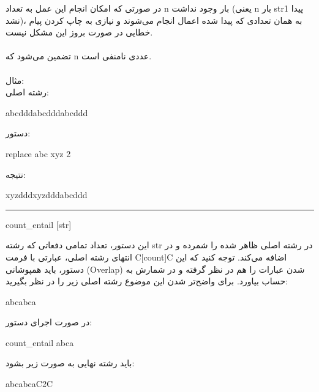 \documentclass[]{article}
\begin{document}
در صورتی که امکان انجام این عمل به تعداد n بار وجود نداشت (یعنی n بار str1 پیدا نشد)، به همان تعدادی که پیدا شده اعمال انجام می‌شوند و نیازی به چاپ کردن پیام خطایی در صورت بروز این مشکل نیست.\\\\
تضمین می‌شود که n عددی نامنفی است.\\\\
مثال:\\
رشته اصلی:\\
\begin{tcolorbox}[boxrule=0pt]
	\begin{latin}
  	  \large{
		abcdddabcdddabcddd
		}
	\end{latin}
\end{tcolorbox}
دستور:
\begin{tcolorbox}[boxrule=0pt]
	\begin{latin}
  	  \large{
  	  	replace abc xyz 2
		}
	\end{latin}
\end{tcolorbox}
نتیجه:
\begin{tcolorbox}[boxrule=0pt]
	\begin{latin}
  	  \large{
  	  	xyzdddxyzdddabcddd
		}
	\end{latin}
\end{tcolorbox}
\noindent\rule[0.5ex]{\linewidth}{1pt}
\begin{tcolorbox}[boxrule=0pt]
	\begin{latin}
  	  \large{
  	  	count\_entail [str]
		}
	\end{latin}
\end{tcolorbox}
این دستور، تعداد تمامی دفعاتی که رشته str در رشته اصلی ظاهر شده را شمرده و در انتهای رشته اصلی، عبارتی با فرمت C[count]C اضافه می‌کند. توجه کنید که این دستور، باید همپوشانی (Overlap) شدن عبارات را هم در نظر گرفته و در شمارش به حساب بیاورد. برای واضح‌تر شدن این موضوع رشته اصلی زیر را در نظر بگیرید:
\begin{tcolorbox}[boxrule=0pt]
	\begin{latin}
  	  \large{
		abcabca
		}
	\end{latin}
\end{tcolorbox}
در صورت اجرای دستور:
\begin{tcolorbox}[boxrule=0pt]
	\begin{latin}
  	  \large{
  	  	count\_entail abca
		}
	\end{latin}
\end{tcolorbox}
باید رشته نهایی به صورت زیر بشود:
\begin{tcolorbox}[boxrule=0pt]
	\begin{latin}
  	  \large{
  	  	abcabcaC2C
		}
	\end{latin}
\end{tcolorbox}
\end{document}
